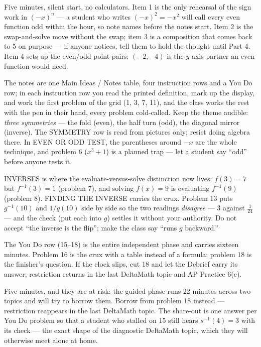 \documentclass[10pt]{article}
\begin{document}
\begin{teachernote}[Warm-Up]
Five minutes, silent start, no calculators. Item 1 is the only rehearsal of the sign work in
$(-x)^n$ --- a student who writes $(-x)^2 = -x^2$ will call every even function odd within the
hour, so note names before the notes start. Item 2 is the swap-and-solve move without the swap;
item 3 is a composition that comes back to 5 on purpose --- if anyone notices, tell them to
hold the thought until Part 4. Item 4 sets up the even/odd point pairs: $(-2, -4)$ is the
$y$-axis partner an even function would need.
\end{teachernote}

\begin{teachernote}
The notes are one Main Ideas / Notes table, four instruction rows and a You Do row; in each
instruction row you read the printed definition, mark up the display, and work the first
problem of the grid (1, 3, 7, 11), and the class works the rest with the pen in their hand,
every problem cold-called. Keep the theme audible: \textit{three symmetries} --- the fold
(even), the half turn (odd), the diagonal mirror (inverse). The SYMMETRY row is read from
pictures only; resist doing algebra there. In EVEN OR ODD TEST, the parentheses around $-x$
are the whole technique, and problem 6 ($x^3 + 1$) is a planned trap --- let a student say
``odd'' before anyone tests it.

INVERSES is where the evaluate-versus-solve distinction now lives: $f(3) = 7$ but
$f^{-1}(3) = 1$ (problem 7), and solving $f(x) = 9$ is evaluating $f^{-1}(9)$ (problem 8).
FINDING THE INVERSE carries the crux. Problem 13 puts $g^{-1}(10)$ and $1/g(10)$ side by side
so the two readings \emph{disagree} --- 3 against $\frac{1}{24}$ --- and the check (put each into
$g$) settles it without your authority. Do not accept ``the inverse is the flip''; make the
class say ``runs $g$ backward.''

The You Do row (15--18) is the entire independent phase and carries sixteen minutes. Problem
16 is the crux with a table instead of a formula; problem 18 is the finisher's question. If the
clock slips, cut 18 and let the Debrief carry its answer; restriction returns in the last
DeltaMath topic and AP Practice 6(e).
\end{teachernote}

\begin{teachernote}[Debrief]
Five minutes, and they are at risk: the guided phase runs 22 minutes across two topics and will
try to borrow them. Borrow from problem 18 instead --- restriction reappears in the last
DeltaMath topic. The share-out is one answer per You Do problem so that a student who stalled
on 15 still hears $s^{-1}(4) = 3$ with its check --- the exact shape of the diagnostic
DeltaMath topic, which they will otherwise meet alone at home.
\end{teachernote}
\end{document}
